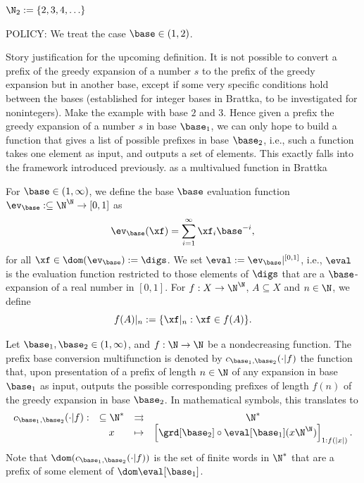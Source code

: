 

$\N_2 := \{2,3,4,\ldots\}$

POLICY: We treat the case $\base \in (1,2)$.

Story justification for the upcoming definition. It is not possible to convert a prefix of the greedy expansion of a number $s$ to the prefix of the greedy expansion but in another base, except if some very specific conditions hold between the bases (established for integer bases in Brattka, to be investigated for nonintegers). Make the example with base $2$ and $3$. Hence given a prefix the greedy expansion of a number $s$ in base $\base_1$, we can only hope to build a function that gives a list of possible prefixes in base $\base_2$, i.e., such a function takes one element as input, and outputs a set of elements. This exactly falls into the framework introduced previously. as a multivalued function in Brattka

For $\base \in (1,\infty)$, we define the base $\base$ evaluation function $ \ev_\base : \subseteq \N^\N \to [0,1]$ as
\begin{equation}
    \ev_\base(\xf) = \sum_{i=1}^\infty \xf_i \base^{-i},
\end{equation}
for all $\xf \in \dom( \ev_\base) := \digs$. We set $\eval :=  \ev_\base|^{[0,1]}$, i.e., $\eval$ is the evaluation function restricted to those elements of $\digs$ that are a $\base$-expansion of a real number in $[0,1]$. For $f : X \to \N^\N$, $A \subseteq X$ and $n \in \N$, we define
\begin{equation}
    f(A)|_n := \{ \xf|_n : \xf \in f(A)\}.
\end{equation}

\begin{definition} Let $\base_1,\base_2 \in (1,\infty)$, and $f : \N \to \N$ be a nondecreasing function. The prefix base conversion multifunction is denoted by $c_{\base_1,\base_2}(\cdot | f)$ the function that, upon presentation of a prefix of length $n \in \N$ of any expansion in base $\base_1$ as input, outputs the possible corresponding prefixes of length $f(n)$ of the greedy expansion in base $\base_2$. In mathematical symbols, this translates to
    \begin{equation}
        \begin{array}{cclc}
            c_{\base_1,\base_2}(\cdot | f) : & \subseteq \N^\ast & \rightrightarrows & \N^\ast\\
            & x & \mapsto &  \left[\grd[\base_2]\circ\eval[\base_1](x\N^\N)\right]_{1:f(|x|)}.
        \end{array}
    \end{equation}
    Note that $\dom (c_{\base_1,\base_2}(\cdot|f))$ is the set of finite words in $\N^\ast$ that are a prefix of some element of $\dom \eval[\base_1]$.
\end{definition}

